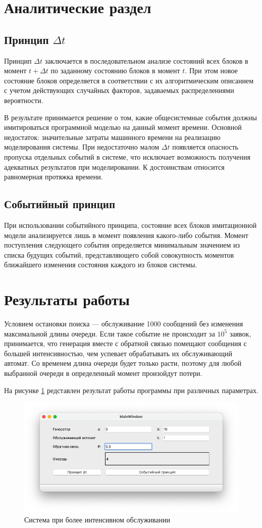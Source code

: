 \section{Аналитические раздел}

\subsection{Принцип $\Delta t$}

Принцип $\Delta t$ заключается в последовательном анализе состояний всех блоков 
в момент $t + \Delta t$ по заданному состоянию блоков в момент $t$. 
При этом новое состояние блоков определяется в соответствии с их алгоритмическим 
описанием с учетом действующих случайных факторов, задаваемых распределениями 
вероятности. 

В результате принимается решение о том, какие общесистемные события 
должны имитироваться программной моделью на данный момент времени. 
Основной недостаток: значительные затраты машинного времени на реализацию 
моделирования системы. При недостаточно малом $\Delta t$ появляется опасность 
пропуска отдельных событий в системе, что исключает возможность получения 
адекватных результатов при моделировании. 
К достоинствам относится равномерная протяжка времени.

\subsection{Событийный принцип}

При использовании событийного принципа, 
состояние всех блоков имитационной модели анализируется лишь 
в момент появления какого-либо события. Момент поступления 
следующего события определяется минимальным значением из списка будущих событий, 
представляющего собой совокупность моментов ближайшего изменения состояния 
каждого из блоков системы.


\section{Результаты работы}

Условием остановки поиска --- обслуживание 1000 сообщений без
изменения максимальной длины очереди. Если такое событие не происходит за $10^5$
заявок, принимается, что генерация вместе с обратной связью помещают
сообщения с большей интенсивностью, чем успевает обрабатывать их
обслуживающий автомат. Со временем длина очереди будет только расти,
поэтому для любой выбранной очереди в определенный момент произойдут
потери.

На рисунке \ref{fig:r2} редставлен результат работы программы при различных параметрах.

\begin{figure}[ht!]
	\includegraphics[width=0.75\linewidth]{assets/images/res.png}
	\caption{Система при более интенсивном обслуживании}
	\label{fig:r2}
\end{figure}